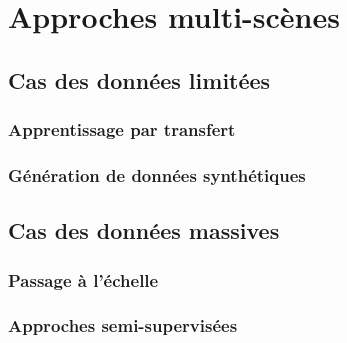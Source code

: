 \chapter{Approches multi-scènes}

\section{Cas des données limitées}

\subsection{Apprentissage par transfert}

\subsection{Génération de données synthétiques}

\section{Cas des données massives}

\subsection{Passage à l'échelle}

\subsection{Approches semi-supervisées}
